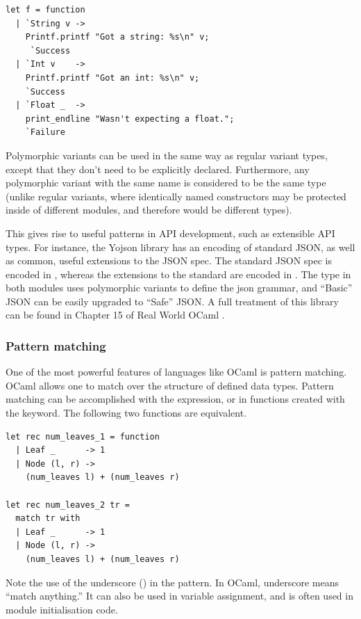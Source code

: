 \begin{lstlisting}
let f = function
  | `String v ->
    Printf.printf "Got a string: %s\n" v;
     `Success
  | `Int v    ->
    Printf.printf "Got an int: %s\n" v;
    `Success
  | `Float _  ->
    print_endline "Wasn't expecting a float.";
    `Failure
\end{lstlisting}

Polymorphic variants can be used in the same way as regular variant
types, except that they don't need to be explicitly
declared. Furthermore, any polymorphic variant with the same name is
considered to be the same type (unlike regular variants, where
identically named constructors may be protected inside of different
modules, and therefore would be different types).

This gives rise to useful patterns in API development, such as
extensible API types. For instance, the Yojson library has an encoding
of standard JSON, as well as common, useful extensions to the JSON
spec. The standard JSON spec is encoded in ,
whereas the extensions to the standard are encoded in
. The  type in both modules uses
polymorphic variants to define the json grammar, and ``Basic'' JSON
can be easily upgraded to ``Safe'' JSON. A full treatment of this
library can be found in Chapter 15 of Real World OCaml \cite{rwo}.

\subsubsection{Pattern matching}

One of the most powerful features of languages like OCaml is pattern
matching. OCaml allows one to match over the structure of defined data
types. Pattern matching can be accomplished with the
expression, or in functions created with the 
keyword. The following two functions are equivalent.

\begin{lstlisting}
let rec num_leaves_1 = function
  | Leaf _      -> 1
  | Node (l, r) ->
    (num_leaves l) + (num_leaves r)

let rec num_leaves_2 tr =
  match tr with
  | Leaf _      -> 1
  | Node (l, r) ->
    (num_leaves l) + (num_leaves r)
\end{lstlisting}

Note the use of the underscore (\code{_}) in the 
pattern. In OCaml, underscore means ``match anything.'' It can also be
used in variable assignment, and is often used in module
initialisation code.

